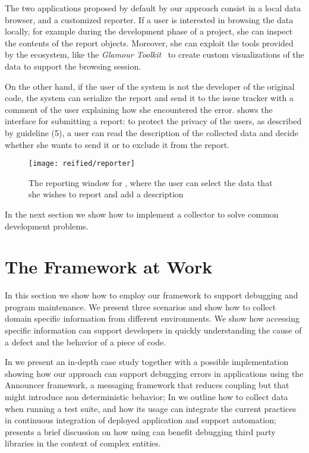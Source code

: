 The two applications proposed by default by our approach consist in a local data browser, and a customized reporter.
If a user is interested in browsing the data locally, for example during the development phase of a project, she can inspect the contents of the report objects.
Moreover, she can exploit the tools provided by the \pha ecosystem, like the \emph{Glamour Toolkit}~\cite{Girb2013a} to create custom visualizations of the data to support the browsing session.

On the other hand, if the user of the system is not the developer of the original code, the system can serialize the report and send it to the issue tracker with a comment of the user explaining how she encountered the error.
 shows the interface for submitting a report: to protect the privacy of the users, as described by guideline (5), a user can read the description of the collected data and decide whether she wants to send it or to exclude it from the report.

\begin{figure}[ht]
  \centering
  \texttt{[image: reified/reporter]}
  \caption{The reporting window for \sln, where the user can select the data that she wishes to report and add a description}
  \label{fig:reporter}
\end{figure}

In the next section we show how to implement a collector to solve common development problems.


\section{The Framework at Work}\label{sec:reified-stories}

In this section we show how to employ our framework to support debugging and program maintenance.
We present three scenarios and show how to collect domain specific information from different environments.
We show how accessing specific information can support developers in quickly understanding the cause of a defect and the behavior of a piece of code.

In  we present an in-depth case study together with a possible implementation showing how our approach can support debugging errors in applications using the Announcer framework, a messaging framework that reduces coupling but that might introduce non deterministic behavior; In  we outline how to collect data when running a test suite, and how its usage can integrate the current practices in continuous integration of deployed application and support automation;  presents a brief discussion on how using \sln can benefit debugging third party libraries in the context of complex entities.

